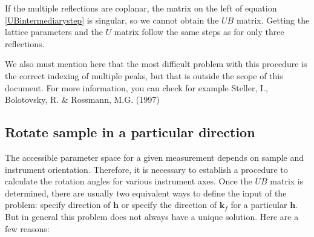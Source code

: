 \documentclass[prb]{revtex4}%
\begin{document}
If the multiple reflections are coplanar, the matrix on the left of equation \ref{UBintermediarystep} is singular, so we
cannot obtain the $UB$ matrix. Getting the lattice parameters and the $U$ matrix follow the same steps as for only three
reflections.

We also must mention here that the most difficult problem with this procedure is the correct indexing of multiple peaks,
but that is outside the scope of this document. For more information, you can check for example Steller, I.,
Bolotovsky, R. \& Rossmann, M.G. (1997)

\subsection{Rotate sample in a particular direction}

The accessible parameter space for a given measurement depends on sample and instrument orientation. Therefore, it is
necessary to establish a procedure to calculate the rotation angles for various instrument axes. Once the $UB$ matrix
is determined, there are usually two equivalent ways to define the input of the problem: specify direction of $\textbf{h}$
or specify the direction of $\textbf{k}_f$ for a particular $\textbf{h}$. But in general this problem does not always have
a unique solution. Here are a few reasons:
\end{document}
